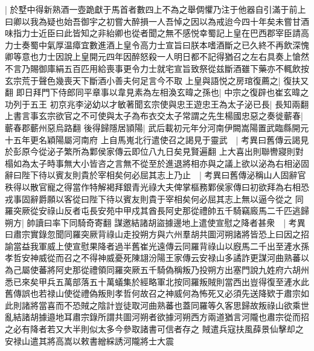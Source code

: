 |{
	於墅中得新熟酒一壺跪獻于馬首者數四上不為之舉倜懼乃注于他器自引滿于前上曰卿以我為疑也始吾御宇之初嘗大醉損一人吾悼之因以為戒迨今四十年矣未嘗甘酒味指力士近臣曰此皆知之非紿卿也從者聞之無不感悦幸蜀記上皇在巴西郡宰臣請高力士奏蜀中氣厚温瘴宜數進酒上皇令高力士宣旨曰朕本嗜酒斷之已久終不再飲深愧卿等意也力士因說上皇開元四年因醉怒殺一人明日都不記得猶召之左右具奏上愴然不言乃賜御庫絹五百匹用給喪事更令力士就宅宣旨致祭從兹斷酒雖下藥亦不輒飲按玄宗荒于聲色幾喪天下斷酒小善夫何足言今不取}
上皇與語悦之房琯復薦之|{
	復扶又翻}
即日拜門下侍郎同平章事以韋見素為左相渙玄暐之孫也|{
	中宗之復辟也崔玄暐之功列于五王}
初京兆李泌幼以才敏著聞玄宗使與忠王遊忠王為太子泌已長|{
	長知兩翻}
上書言事玄宗欲官之不可使與太子為布衣交太子常謂之先生楊國忠惡之奏徙蘄春|{
	蘄春郡蘄州惡烏路翻}
後得歸隱居頴陽|{
	武后載初元年分河南伊闕嵩陽置武臨縣開元十五年更名穎陽屬河南府}
上自馬嵬北行遣使召之謁見于靈武　|{
	考異曰舊傳云謁見於彭原今從泌子繁所為鄴侯家傳云即位八九日矣見賢遍翻}
上大喜出則聯轡寢則對榻如為太子時事無大小皆咨之言無不從至於進退將相亦與之議上欲以泌為右相泌固辭曰陛下待以賓友則貴於宰相矣何必屈其志上乃止　|{
	考異曰舊傳泌稱山人固辭官秩得以散官寵之得當作特解褐拜銀青光祿大夫俾掌樞務鄴侯家傳曰初欲拜為右相恐戎事固辭爵願以客從曰陛下待以賓友則貴于宰相矣何必屈其志上無以逼今從之}
同羅突厥從安祿山反者屯長安苑中甲戍其酋長阿史那從禮帥五千騎竊廄馬二千匹逃歸朔方|{
	帥讀曰率下同騎奇寄翻}
謀邀結諸胡盜據邊地上遣使宣慰之降者甚衆　|{
	考異曰肅宗實錄忽聞同羅突厥背祿山走投朔方與六州羣胡共圖河朔諸將皆恐上曰因之招諭當益我軍威上使宣慰果降者過半舊崔光遠傳云同羅背祿山以廐馬二千出至滻水孫孝哲安神威從而召之不得神威憂死陳翃汾陽王家傳云安禄山多譎詐更謀河曲熟蕃以為己屬使蕃將阿史那從禮領同羅突厥五千騎偽稱叛乃投朔方出塞門說九姓府六胡州悉已來矣甲兵五萬部落五十萬蟻集於經略軍北按同羅叛賊則當西出豈得復至滻水此舊傳誤也若禄山使從禮偽叛則孝哲何故召之神威何為怖死又必須先送降欵于肅宗如此則諸將當喜而不恐賊之陰計豈徒取河曲熟蕃也蓋同羅等久客思歸故叛祿山欲乘世亂結諸胡據邉地耳肅宗錄所謂共圖河朔者欲據河朔西方兩道猶言河隴也肅宗從而招之必有降者若又大半則似太多今參取諸書可信者存之}
賊遣兵寇扶風薛景仙擊却之安禄山遣其將高嵩以敕書繒綵誘河隴將士大震

